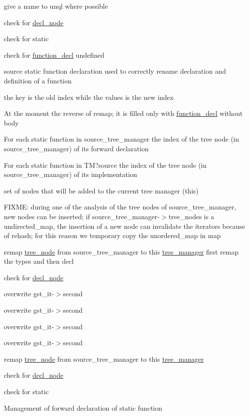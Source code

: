give a name to unql where possible

check for \hyperlink{structdecl__node}{decl\+\_\+node}

check for static

check for \hyperlink{structfunction__decl}{function\+\_\+decl} undefined

source static function declaration used to correctly rename declaration and definition of a function

the key is the old index while the values is the new index

At the moment the reverse of remap; it is filled only with \hyperlink{structfunction__decl}{function\+\_\+decl} without body

For each static function in source\+\_\+tree\+\_\+manager the index of the tree node (in source\+\_\+tree\+\_\+manager) of its forward declaration

For each static function in TM?source the index of the tree node (in source\+\_\+tree\+\_\+manager) of its implementation

set of nodes that will be added to the current tree manager (this)

F\+I\+X\+ME\+: during one of the analysis of the tree nodes of source\+\_\+tree\+\_\+manager, new nodes can be inserted; if source\+\_\+tree\+\_\+manager-\/$>$tree\+\_\+nodes is a undirected\+\_\+map, the insertion of a new node can invalidate the iterators because of rehash; for this reason we temporary copy the unordered\+\_\+map in map

remap \hyperlink{classtree__node}{tree\+\_\+node} from source\+\_\+tree\+\_\+manager to this \hyperlink{classtree__manager}{tree\+\_\+manager} first remap the types and then decl

check for \hyperlink{structdecl__node}{decl\+\_\+node}

overwrite gst\+\_\+it-\/$>$second

overwrite gst\+\_\+it-\/$>$second

overwrite gst\+\_\+it-\/$>$second

overwrite gst\+\_\+it-\/$>$second

remap \hyperlink{classtree__node}{tree\+\_\+node} from source\+\_\+tree\+\_\+manager to this \hyperlink{classtree__manager}{tree\+\_\+manager}

check for \hyperlink{structdecl__node}{decl\+\_\+node}

check for static

Management of forward declaration of static function

